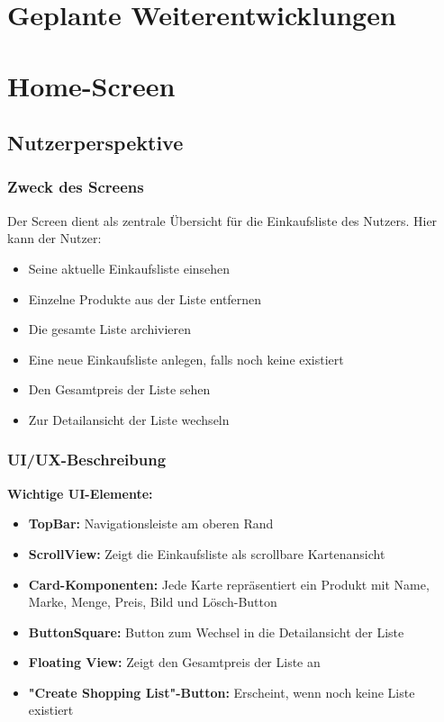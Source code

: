 \documentclass[12pt, a4paper]{report} %
\begin{document}
\section{Geplante Weiterentwicklungen}

\section{Home-Screen}
\label{sec:home_screen}

\subsection{Nutzerperspektive}

\subsubsection{Zweck des Screens}
Der Screen dient als zentrale Übersicht für die Einkaufsliste des Nutzers. Hier kann der Nutzer:
\begin{itemize}
    \item Seine aktuelle Einkaufsliste einsehen
    \item Einzelne Produkte aus der Liste entfernen
    \item Die gesamte Liste archivieren
    \item Eine neue Einkaufsliste anlegen, falls noch keine existiert
    \item Den Gesamtpreis der Liste sehen
    \item Zur Detailansicht der Liste wechseln
\end{itemize}

\subsubsection{UI/UX-Beschreibung}

\textbf{Wichtige UI-Elemente:}
\begin{itemize}
    \item \textbf{TopBar:} Navigationsleiste am oberen Rand
    \item \textbf{ScrollView:} Zeigt die Einkaufsliste als scrollbare Kartenansicht
    \item \textbf{Card-Komponenten:} Jede Karte repräsentiert ein Produkt mit Name, Marke, Menge, Preis, Bild und Lösch-Button
    \item \textbf{ButtonSquare:} Button zum Wechsel in die Detailansicht der Liste
    \item \textbf{Floating View:} Zeigt den Gesamtpreis der Liste an
    \item \textbf{"Create Shopping List"-Button:} Erscheint, wenn noch keine Liste existiert
\end{itemize}
\end{document}
